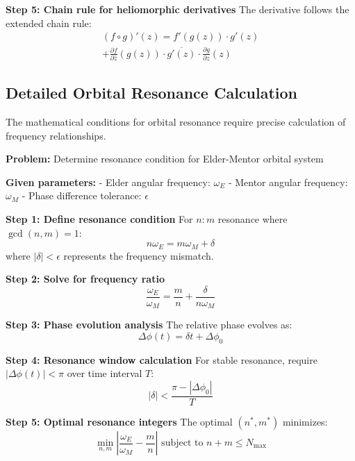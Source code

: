 \textbf{Step 5: Chain rule for heliomorphic derivatives}
The derivative follows the extended chain rule:
\begin{multline}
(f \circ g)'(z) = f'(g(z)) \cdot g'(z) \\
+ \frac{\partial f}{\partial \bar{z}}(g(z)) \cdot \overline{g'(z)} \cdot \frac{\partial g}{\partial z}(z)
\end{multline}

\subsection{Detailed Orbital Resonance Calculation}

The mathematical conditions for orbital resonance require precise calculation of frequency relationships.

\textbf{Problem:} Determine resonance condition for Elder-Mentor orbital system

\textbf{Given parameters:}
- Elder angular frequency: $\omega_E$
- Mentor angular frequency: $\omega_M$  
- Phase difference tolerance: $\epsilon$

\textbf{Step 1: Define resonance condition}
For $n:m$ resonance where $\gcd(n,m) = 1$:
\begin{equation}
n\omega_E = m\omega_M + \delta
\end{equation}
where $|\delta| < \epsilon$ represents the frequency mismatch.

\textbf{Step 2: Solve for frequency ratio}
\begin{equation}
\frac{\omega_E}{\omega_M} = \frac{m}{n} + \frac{\delta}{n\omega_M}
\end{equation}

\textbf{Step 3: Phase evolution analysis}
The relative phase evolves as:
\begin{equation}
\Delta\phi(t) = \delta t + \Delta\phi_0
\end{equation}

\textbf{Step 4: Resonance window calculation}
For stable resonance, require $|\Delta\phi(t)| < \pi$ over time interval $T$:
\begin{equation}
|\delta| < \frac{\pi - |\Delta\phi_0|}{T}
\end{equation}

\textbf{Step 5: Optimal resonance integers}
The optimal $(n^*, m^*)$ minimizes:
\begin{equation}
\min_{n,m} \left|\frac{\omega_E}{\omega_M} - \frac{m}{n}\right| \text{ subject to } n+m \leq N_{\max}
\end{equation}

